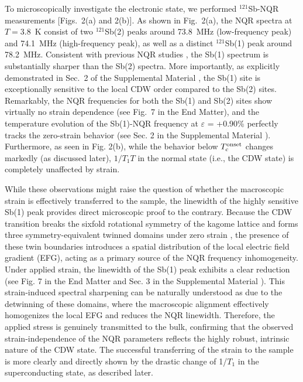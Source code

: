 \documentclass[aps,prl,twocolumn,superscriptaddress]{revtex4-2}
\begin{document}
To microscopically investigate the electronic state, we performed $^{121}$Sb-NQR measurements [Figs.~2(a) and 2(b)]. As shown in Fig.~2(a), the NQR spectra at $T = 3.8$~K consist of two $^{121}$Sb(2) peaks around 73.8~MHz (low-frequency peak) and 74.1~MHz (high-frequency peak), as well as a distinct $^{121}$Sb(1) peak around 78.2~MHz. Consistent with previous NQR studies \cite{FengNPJ,LuoNPJ,FengNatCom}, the Sb(1) spectrum is substantially sharper than the Sb(2) spectra. More importantly, as explicitly demonstrated in Sec.~2 of the Supplemental Material \cite{SM}, the Sb(1) site is exceptionally sensitive to the local CDW order compared to the Sb(2) sites. Remarkably, the NQR frequencies for both the Sb(1) and Sb(2) sites show virtually no strain dependence (see Fig.~7 in the End Matter), and the temperature evolution of the Sb(1)-NQR frequency at $\varepsilon$ = +0.90\% perfectly tracks the zero-strain behavior (see Sec. 2 in the Supplemental Material \cite{SM}). Furthermore, as seen in Fig. 2(b), while the behavior below $T_{\rm c}^{\rm onset}$ changes markedly (as discussed later), $1/T_1T$ in the normal state (i.e., the CDW state) is completely unaffected by strain.

While these observations might raise the question of whether the macroscopic strain is effectively transferred to the sample, the linewidth of the highly sensitive Sb(1) peak provides direct microscopic proof to the contrary. Because the CDW transition breaks the sixfold rotational symmetry of the kagome lattice and forms three symmetry-equivalent twinned domains under zero strain \cite{Stahl_PRB2022}, the presence of these twin boundaries introduces a spatial distribution of the local electric field gradient (EFG), acting as a primary source of the NQR frequency inhomogeneity. Under applied strain, the linewidth of the Sb(1) peak exhibits a clear reduction (see Fig. 7 in the End Matter and Sec. 3 in the Supplemental Material \cite{SM}). This strain-induced spectral sharpening can be naturally understood as due to the detwinning of these domains, where the macroscopic alignment effectively homogenizes the local EFG and reduces the NQR linewidth. Therefore, the applied stress is genuinely transmitted to the bulk, confirming that the observed strain-independence of the NQR parameters reflects the highly robust, intrinsic nature of the CDW state. The successful transferring of  the strain to the sample is more clearly and directly shown by the drastic change of 1/$T_1$ in the superconducting state, as described later.
\end{document}
